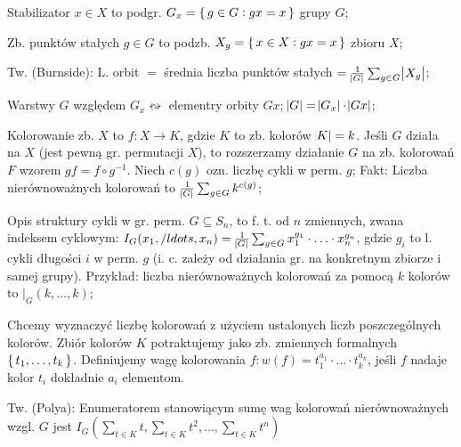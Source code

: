 Stabilizator $x \in X$ to podgr. $G_x = \set{g\in G: gx = x}$ grupy $G$;

Zb. punktów stałych $g \in G$ to podzb. $X_g = \set{x\in X: gx=x}$ zbioru $X$;

Tw. (Burnside): L. orbit $=$ średnia liczba punktów stałych
  $=\frac{1}{\abs{G}}\sum_{g\in G}\abs{X_g}$;

Warstwy $G$ względem $G_x \leftrightsquigarrow$ elementry orbity $Gx$;
$\abs{G} = \abs{G_x} \cdot \abs{Gx}$;

Kolorowanie zb. $X$ to $f: X\rightarrow K$, gdzie $K$ to zb. kolorów
  $\abs{K} = k$. Jeśli $G$ działa na $X$ (jest pewną gr. permutacji $X$), to
  rozszerzamy działanie $G$ na zb. kolorowań $F$ wzorem $gf=f\circ g^{-1}$.
  Niech $c(g)$ ozn. liczbę cykli w perm. $g$; Fakt: Liczba nierównoważnych
  kolorowań to $\frac{1}{\abs{G}}\sum_{g\in G}k^{c(g)}$;

Opis struktury cykli w gr. perm. $G \subseteq S_n$, to f. t. od $n$ zmiennych,
  zwana indeksem cyklowym: $I_G(x_1,/ldots,x_n)=
  \frac{1}{\abs{G}}\sum_{g\in G}x_1^{g_1}\cdot\ldots\cdot x_n^{g_n}$, gdzie
  $g_i$ to l. cykli długości $i$ w perm. $g$ (i. c. zależy od działania gr.
  na konkretnym zbiorze i samej grupy). Przykład: liczba nierównoważnych
  kolorowań za pomocą $k$ kolorów to $|_G(k,\ldots,k)$;

Chcemy wyznaczyć liczbę kolorowań z użyciem ustalonych liczb
  poszczególnych kolorów. Zbiór kolorów $K$ potraktujemy jako zb. zmiennych
  formalnych $\set{t_1,\ldots,t_k}$. Definiujemy wagę kolorowania
  $f: w(f) = t_1^{a_1}\cdot\ldots\cdot t_k^{a_k}$, jeśli $f$ nadaje kolor $t_i$
  dokładnie $a_i$ elementom.

Tw. (Polya): Enumeratorem stanowiącym sumę wag kolorowań nierównoważnych wzgl.
  $G$ jest $I_G(\sum_{t\in K}t, \sum_{t\in K}t^2, \ldots, \sum_{t\in K}t^n)$
